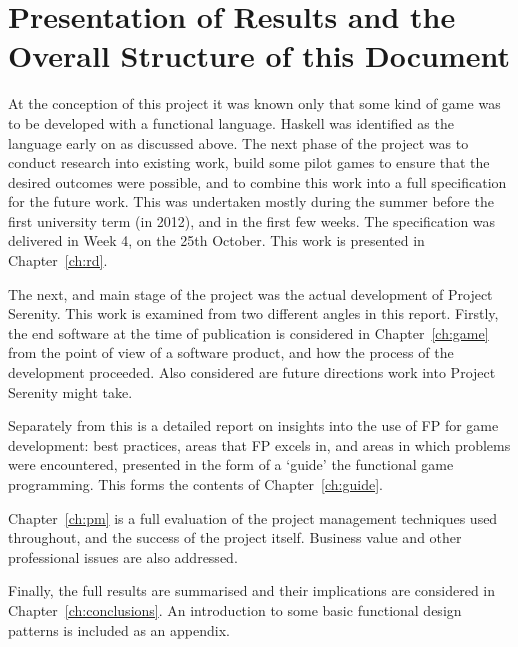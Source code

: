 \section{Presentation of Results and the Overall Structure of this Document}

At the conception of this project it was known only that some kind of game was to be developed with a functional language. Haskell was identified as the language early on as discussed above. The next phase of the project was to conduct research into existing work, build some pilot games to ensure that the desired outcomes were possible, and to combine this work into a full specification for the future work. This was undertaken mostly during the summer before the first university term (in 2012), and in the first few weeks. The specification was delivered in Week 4, on the 25th October. This work is presented in Chapter~\ref{ch:rd}.

The next, and main stage of the project was the actual development of Project Serenity. This work is examined from two different angles in this report. Firstly, the end software at the time of publication is considered in Chapter~\ref{ch:game} from the point of view of a software product, and how the process of the development proceeded. Also considered are future directions work into Project Serenity might take. 

Separately from this is a detailed report on insights into the use of FP for game development: best practices, areas that FP excels in, and areas in which problems were encountered, presented in the form of a `guide' the functional game programming. This forms the contents of Chapter~\ref{ch:guide}.

Chapter~\ref{ch:pm} is a full evaluation of the project management techniques used throughout, and the success of the project itself. Business value and other professional issues are also addressed.

Finally, the full results are summarised and their implications are considered in Chapter~\ref{ch:conclusions}. An introduction to some basic functional design patterns is included as an appendix.